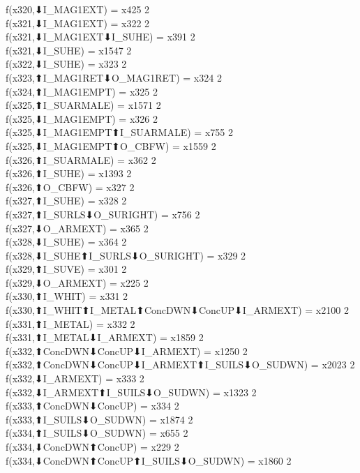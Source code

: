 f(x320,⬇I_MAG1EXT) = x425 {2} \\
f(x321,⬇I_MAG1EXT) = x322 {2} \\
f(x321,⬇I_MAG1EXT⬇I_SUHE) = x391 {2} \\
f(x321,⬇I_SUHE) = x1547 {2} \\
f(x322,⬇I_SUHE) = x323 {2} \\
f(x323,⬆I_MAG1RET⬇O_MAG1RET) = x324 {2} \\
f(x324,⬆I_MAG1EMPT) = x325 {2} \\
f(x325,⬆I_SUARMALE) = x1571 {2} \\
f(x325,⬇I_MAG1EMPT) = x326 {2} \\
f(x325,⬇I_MAG1EMPT⬆I_SUARMALE) = x755 {2} \\
f(x325,⬇I_MAG1EMPT⬆O_CBFW) = x1559 {2} \\
f(x326,⬆I_SUARMALE) = x362 {2} \\
f(x326,⬆I_SUHE) = x1393 {2} \\
f(x326,⬆O_CBFW) = x327 {2} \\
f(x327,⬆I_SUHE) = x328 {2} \\
f(x327,⬆I_SURLS⬇O_SURIGHT) = x756 {2} \\
f(x327,⬇O_ARMEXT) = x365 {2} \\
f(x328,⬇I_SUHE) = x364 {2} \\
f(x328,⬇I_SUHE⬆I_SURLS⬇O_SURIGHT) = x329 {2} \\
f(x329,⬆I_SUVE) = x301 {2} \\
f(x329,⬇O_ARMEXT) = x225 {2} \\
f(x330,⬆I_WHIT) = x331 {2} \\
f(x330,⬆I_WHIT⬆I_METAL⬆ConcDWN⬇ConcUP⬇I_ARMEXT) = x2100 {2} \\
f(x331,⬆I_METAL) = x332 {2} \\
f(x331,⬆I_METAL⬇I_ARMEXT) = x1859 {2} \\
f(x332,⬆ConcDWN⬇ConcUP⬇I_ARMEXT) = x1250 {2} \\
f(x332,⬆ConcDWN⬇ConcUP⬇I_ARMEXT⬆I_SUILS⬇O_SUDWN) = x2023 {2} \\
f(x332,⬇I_ARMEXT) = x333 {2} \\
f(x332,⬇I_ARMEXT⬆I_SUILS⬇O_SUDWN) = x1323 {2} \\
f(x333,⬆ConcDWN⬇ConcUP) = x334 {2} \\
f(x333,⬆I_SUILS⬇O_SUDWN) = x1874 {2} \\
f(x334,⬆I_SUILS⬇O_SUDWN) = x655 {2} \\
f(x334,⬇ConcDWN⬆ConcUP) = x229 {2} \\
f(x334,⬇ConcDWN⬆ConcUP⬆I_SUILS⬇O_SUDWN) = x1860 {2} \\
